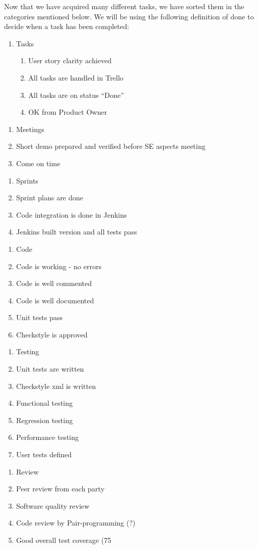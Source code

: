 Now that we have acquired many different tasks, we have sorted them in the categories mentioned below. We will be using the following definition of done to decide when a task has been completed:

\begin{enumerate}
\item Tasks
	\begin{enumerate}
	   \item User story clarity achieved
	   \item All tasks are handled in Trello
	   \item All tasks are on status “Done”
	   \item OK from Product Owner
	\end{enumerate}
\end{enumerate}
\begin{enumerate}
\item Meetings
   \item Short demo prepared and verified before SE aspects meeting
   \item Come on time
\end{enumerate}
\begin{enumerate}
\item Sprints
   \item Sprint plans are done
   \item Code integration is done in Jenkins
   \item Jenkins built version and all tests pass
\end{enumerate}
\begin{enumerate}
\item Code
   \item Code is working - no errors 
   \item Code is well commented
   \item Code is well documented
   \item Unit tests pass
   \item Checkstyle is approved
\end{enumerate}
\begin{enumerate}
\item Testing
   \item Unit tests are written
   \item Checkstyle xml is written
   \item Functional testing
   \item Regression testing
   \item Performance testing
   \item User tests defined
\end{enumerate}
\begin{enumerate}
\item Review
   \item Peer review from each party
   \item Software quality review
   \item Code review by Pair-programming (?)
   \item Good overall test coverage (75%
\end{enumerate}
